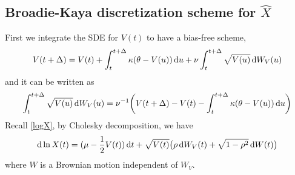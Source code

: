 \documentclass{ws-ijfe}
\begin{document}
\subsection{Broadie-Kaya discretization scheme for $\hat{X}$}
First we integrate the SDE for $V(t)$ to have a bias-free scheme,
\begin{equation*}
  V(t+\Delta) = V(t)+\int_{t}^{t+\Delta}\kappa(\theta-V(u))\,\mathrm{d} u +\nu\int_{t}^{t+\Delta}\sqrt{V(u)}\,\mathrm{d} W_V(u)
\end{equation*}
and it can be written as
\begin{equation}\label{dW_V}
\int_{t}^{t+\Delta}\sqrt{V(u)}\,\d W_V(u)=\nu^{-1}\bigg(V(t+\Delta)- V(t)-\int_{t}^{t+\Delta}\kappa(\theta-V(u))\,\d u\bigg)
\end{equation}
Recall \eqref{logX}, by Cholesky decomposition, we have
\begin{equation*}
 \mathrm{d} \ln X(t)=(\mu-\frac{1}{2}V(t))\,\mathrm{d} t +\sqrt{V(t)}\big(\rho\,\mathrm{d} W_V(t)+\sqrt{1-\rho^2}\,\mathrm{d} W(t)\big)
\end{equation*}
where $W$ is a Brownian motion independent of $W_V$.
\end{document}
